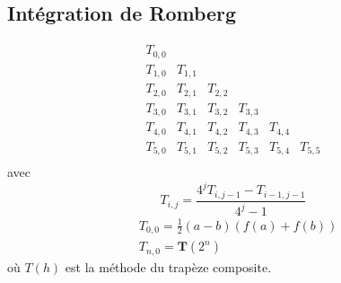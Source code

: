 \documentclass[a4paper,9pt]{extarticle}
\begin{document}
\begin{multicols*}{2}
\section{Intégration de Romberg}
$$
\begin{array}{cccccc}
T_{0,0} & & & & & \\
T_{1,0} & T_{1,1} & & & & \\
T_{2,0} & T_{2,1} & T_{2,2} & & & \\
T_{3,0} & T_{3,1} & T_{3,2} & T_{3,3} & & \\
T_{4,0} & T_{4,1} & T_{4,2} & T_{4,3} & T_{4,4} & \\
T_{5,0} & T_{5,1} & T_{5,2} & T_{5,3} & T_{5,4} & T_{5,5} \\
\end{array}
$$
avec
$$
T_{i,j}=\frac{4^jT_{i,j-1}-T_{i-1,j-1}}{4^j-1}
$$
\begin{align*}
& T_{0,0}=\frac{1}{2}(a-b)(f(a)+f(b))\\
& T_{n,0}=\textbf{T}(2^n)
\end{align*}
où $T(h)$ est la méthode du trapèze composite.

\end{multicols*}
\end{document}
